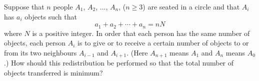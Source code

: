 Suppose that $n$ people $A_1$, $A_2$, $\ldots$, $A_n$, ($n \geq 3$) are seated in a circle and that $A_i$ has $a_i$ objects such that \[ a_1 + a_2 + \cdots + a_n = nN \] where $N$ is a positive integer. In order that each person has the same number of objects, each person $A_i$ is to give or to receive a certain number of objects to or from its two neighbours $A_{i-1}$ and $A_{i+1}$. (Here $A_{n+1}$ means $A_1$ and $A_n$ means $A_0$.) How should this redistribution be performed so that the total number of objects transferred is minimum?